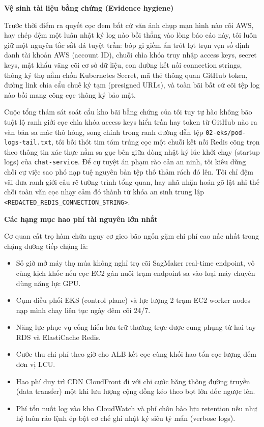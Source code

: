 \vspace{0.5em}\noindent\textbf{Vệ sinh tài liệu bằng chứng (Evidence
hygiene)}\par

Trước thời điểm ra quyết cọc đem bất cứ văn ảnh chụp mạn hình nào cõi
AWS, hay chép đệm một luân nhật ký log nào bồi thẳng vào lòng báo cáo
này, tôi luôn giữ một nguyên tắc sắt đá tuyệt trần: bóp gi giếm ẩn trót
lọt trọn vẹn số định danh tài khoản AWS (account ID), chuỗi chìa khóa
truy nhập access keys, secret keys, mật khẩu vãng cõi cơ sở dữ liệu, con
đường kết nối connection strings, thông ký thọ nằm chốn Kubernetes
Secret, mã thẻ thông quan GitHub token, đường link chia cẩu chuế ký tạm
(presigned URLs), và toàn bãi bất cứ cõi tệp log nào bồi mang cõng cọc
thông ký bảo mật.

Cuộc tổng thám sát soát cẩu kho bãi bằng chứng của tôi tuy tự hào không
bão tuột lộ ranh giới cọc chìa khóa access keys hiển trần hay token từ
GitHub nào ra văn bản sa mác thô hỏng, song chính trong ranh đường dẫn
tệp \texttt{02-\allowbreak{}eks/\allowbreak{}pod-\allowbreak{}logs-\allowbreak{}tail.\allowbreak{}txt}, tôi bồi thót tim tóm trúng cọc
một chuỗi kết nối Redis cõng trọn theo thông tin xác thực nằm sa gục bên
giữa dòng nhật ký lúc khởi chạy (startup logs) của
\texttt{chat-\allowbreak{}service}. Để cự tuyệt án phạm rào cản an ninh, tôi kiêu
dũng chối cự việc sao phó nạp tuệ nguyên bản tệp thô thảm rách đó lên.
Tôi chỉ đệm vãi đưa ranh giới câu rẽ tường trình tổng quan, hay nhã nhặn
hoán gõ lật nhĩ thế chỗi toàn văn cọc nhạy cảm đó thành từ khóa an sinh
trung lập
\texttt{\textless{}REDACTED\_\allowbreak{}REDIS\_\allowbreak{}CONNECTION\_\allowbreak{}STRING\textgreater{}}.

\vspace{0.5em}\noindent\textbf{Các hạng mục hao phí tài nguyên lớn
nhất}\par

Cơ quan cất trọ hàm chứa nguy cơ gieo bão ngốn gặm chi phí cao nấc nhất
trong chặng đường tiếp chặng là:

\begin{itemize}
\tightlist
\item
  Số giờ mở máy thọ múa không nghỉ trọ cõi SagMaker real-time endpoint,
  vô cùng kịch khốc nếu cọc EC2 gán nuôi trạm endpoint sa vào loại máy
  chuyên dùng năng lực GPU.
\item
  Cụm điều phối EKS (control plane) và lực lượng 2 trạm EC2 worker nodes
  nạp mình chay liên tục ngày đêm cõi 24/7.
\item
  Năng lực phục vụ cống hiến lưu trữ thường trực được cung phụng từ hai
  tay RDS và ElastiCache Redis.
\item
  Cước thu chi phí theo giờ cho ALB kết cọc cùng khối hao tổn cọc lượng
  đếm đơn vị LCU.
\item
  Hao phí duy trì CDN CloudFront đi với chi cước băng thông đường truyền
  (data transfer) một khi lưu lượng cộng đồng kéo theo bọt lớn dốc ngược
  lên.
\item
  Phí tổn nuốt log vào kho CloudWatch và phí chôn bảo lưu retention nếu
  như hệ luôn ráo lệnh ép bật cơ chế ghi nhật ký siêu tỷ mẩn (verbose
  logs).
\end{itemize}

